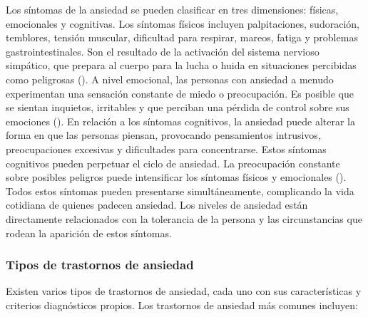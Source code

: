 Los síntomas de la ansiedad se pueden clasificar en tres dimensiones: físicas, emocionales y cognitivas. Los síntomas físicos incluyen palpitaciones, sudoración, temblores, tensión muscular, dificultad para respirar, mareos, fatiga y problemas gastrointestinales. Son el resultado de la activación del sistema nervioso simpático, que prepara al cuerpo para la lucha o huida en situaciones percibidas como peligrosas (\cite{CRASKE:2016}). A nivel emocional, las personas con ansiedad a menudo experimentan una sensación constante de miedo o preocupación. Es posible que se sientan inquietos, irritables y que perciban una pérdida de control sobre sus emociones (\cite{BARLOW:2002}). En relación a los síntomas cognitivos, la ansiedad puede alterar la forma en que las personas piensan, provocando pensamientos intrusivos, preocupaciones excesivas y dificultades para concentrarse. Estos síntomas cognitivos pueden perpetuar el ciclo de ansiedad. La preocupación constante sobre posibles peligros puede intensificar los síntomas físicos y emocionales (\cite{CLARK:2011}). Todos estos síntomas pueden presentarse simultáneamente, complicando la vida cotidiana de quienes padecen ansiedad. Los niveles de ansiedad están directamente relacionados con la tolerancia de la persona y las circunstancias que rodean la aparición de estos síntomas.

\subsubsection{Tipos de trastornos de ansiedad}
Existen varios tipos de trastornos de ansiedad, cada uno con sus características y criterios diagnósticos propios. Los trastornos de ansiedad más comunes incluyen:

